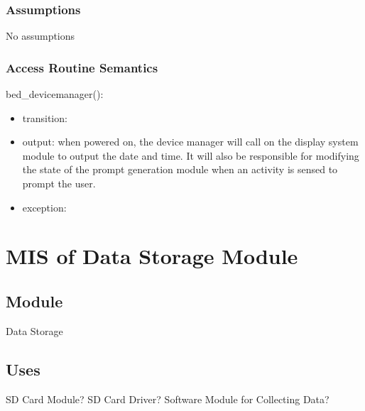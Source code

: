 \documentclass[12pt, titlepage]{article}
\begin{document}
\subsubsection{Assumptions}

No assumptions

\subsubsection{Access Routine Semantics}

\noindent bed\_devicemanager():
\begin{itemize}
\item transition:   
\item output: when powered on, the device manager will call on the display system module to output the date and time. It will also be responsible for modifying the state of the prompt generation module when an activity is sensed to prompt the user. %
\item exception:  
\end{itemize}



\newpage


\section{MIS of Data Storage Module} \label{mDS_1} 

\subsection{Module}

Data Storage

\subsection{Uses}

SD Card Module? SD Card Driver? Software Module for Collecting Data?   %
\end{document}
